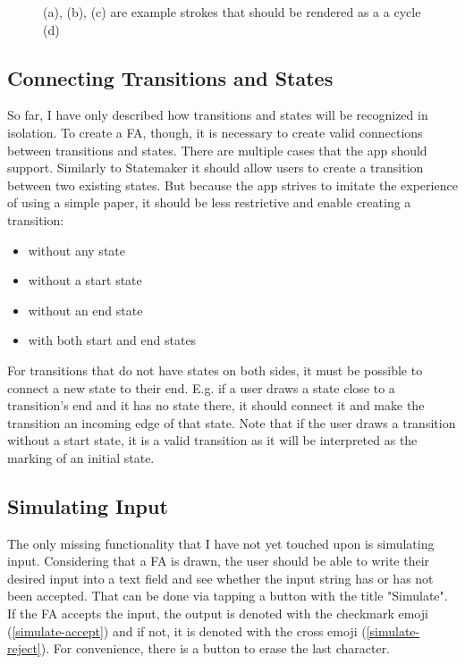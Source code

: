 \begin{figure}
    \centering
    \caption{(a), (b), (c) are example strokes that should be rendered as a a cycle (d)}\label{cycle}
\end{figure}

\subsection{Connecting Transitions and States}

So far, I have only described how transitions and states will be recognized in isolation. To create a FA, though, it is necessary to create valid connections between transitions and states. There are multiple cases that the app should support. Similarly to Statemaker \cite{state-maker} it should allow users to create a transition between two existing states. But because the app strives to imitate the experience of using a simple paper, it should be less restrictive and enable creating a transition:
\begin{itemize}
    \item without any state
    \item without a start state
    \item without an end state
    \item with both start and end states
\end{itemize}
For transitions that do not have states on both sides, it must be possible to connect a new state to their end. E.g. if a user draws a state close to a transition's end and it has no state there, it should connect it and make the transition an incoming edge of that state. Note that if the user draws a transition without a start state, it is a valid transition as it will be interpreted as the marking of an initial state.

\subsection{Simulating Input}

The only missing functionality that I have not yet touched upon is simulating input. Considering that a FA is drawn, the user should be able to write their desired input into a text field and see whether the input string has or has not been accepted. That can be done via tapping a button with the title "Simulate". If the FA accepts the input, the output is denoted with the checkmark emoji (\ref{simulate-accept}) and if not, it is denoted with the cross emoji (\ref{simulate-reject}). For convenience, there is a button to erase the last character.

